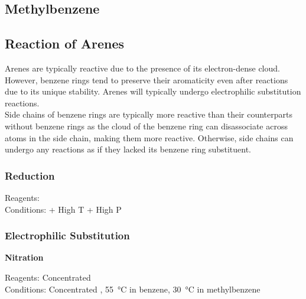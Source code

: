 \documentclass[../main]{subfiles}
\begin{document}
	\subsection{Methylbenzene}





	\subsection{Reaction of Arenes}

	Arenes are typically reactive due to the presence of its electron-dense  cloud. However, benzene rings tend to preserve their aromaticity even after reactions due to its unique stability. Arenes will typically undergo electrophilic substitution reactions. \\

	Side chains of benzene rings are typically more reactive than their counterparts without benzene rings as the  cloud of the benzene ring can disassociate across  atoms in the side chain, making them more reactive. Otherwise, side chains can undergo any reactions as if they lacked its benzene ring substituent.

	\subsubsection{Reduction}

	Reagents: \\
	Conditions:  + High T + High P 

	\subsubsection{Electrophilic Substitution}

	\noindent \textbf{Nitration}

	Reagents: Concentrated  \\
	Conditions: Concentrated , \SI{55}{\celsius} in benzene, \SI{30}{\celsius} in methylbenzene \\
\end{document}
